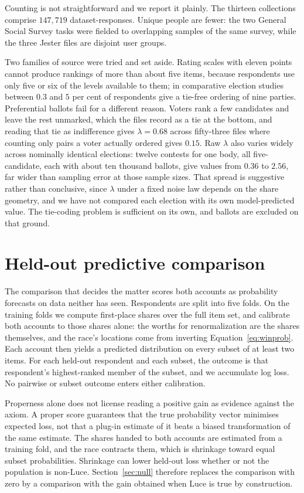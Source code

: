 \documentclass[11pt]{article}
\begin{document}
Counting is not straightforward and we report it plainly. The thirteen collections comprise
$147{,}719$ dataset-responses. Unique people are fewer: the two General Social
Survey tasks were fielded to overlapping samples of the same survey, while the
three Jester files are disjoint user groups.

Two families of source were tried and set aside. Rating scales with eleven points
cannot produce rankings of more than about five items, because respondents use only
five or six of the levels available to them; in comparative election studies
between $0.3$ and $5$ per cent of respondents give a tie-free ordering of nine
parties. Preferential ballots fail for a different reason. Voters rank a few
candidates and leave the rest unmarked, which the files record as a tie at the
bottom, and reading that tie as indifference gives $\lambda = 0.68$ across
fifty-three files where counting only pairs a voter actually ordered gives $0.15$.
Raw $\lambda$ also varies widely across nominally identical elections: twelve
contests for one body, all five-candidate, each with about ten thousand ballots, give
values from $0.36$ to $2.56$, far wider than sampling error at those sample sizes.
That spread is suggestive rather than conclusive, since $\lambda$ under a fixed noise
law depends on the share geometry, and we have not compared each election with its own
model-predicted value. The tie-coding problem is sufficient on its own, and ballots
are excluded on that ground.

\section{Held-out predictive comparison}
\label{sec:results}

The comparison that decides the matter scores both accounts as probability
forecasts on data neither has seen. Respondents are split into five folds. On the
training folds we compute first-place shares over the full item set, and calibrate
both accounts to those shares alone: the worths for renormalization are the shares
themselves, and the race's locations come from inverting
Equation~\eqref{eq:winprob}. Each account then yields a predicted distribution on
every subset of at least two items. For each held-out respondent and each subset,
the outcome is that respondent's highest-ranked member of the subset, and we
accumulate log loss. No pairwise or subset outcome enters either calibration.

Properness alone does not license reading a positive gain as evidence against the
axiom. A proper score guarantees that the true probability vector minimises expected
loss, not that a plug-in estimate of it beats a biased transformation of the same
estimate. The shares handed to both accounts are estimated from a training fold, and
the race contracts them, which is shrinkage toward equal subset probabilities.
Shrinkage can lower held-out loss whether or not the population is non-Luce.
Section~\ref{sec:null} therefore replaces the comparison with zero by a comparison
with the gain obtained when Luce is true by construction.
\end{document}
